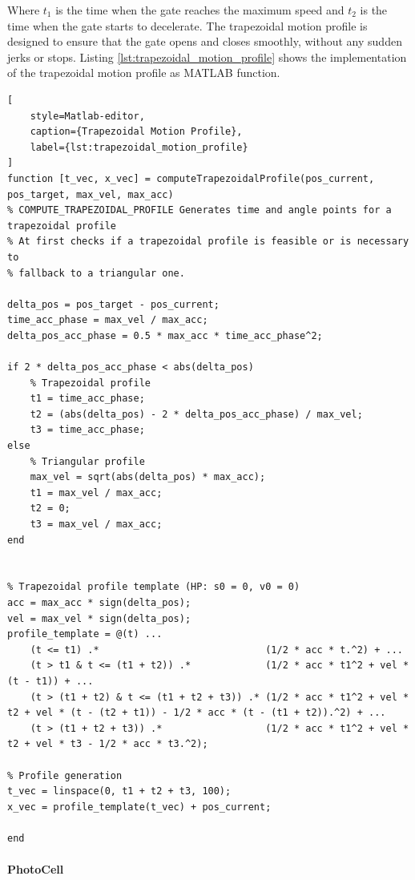 Where $t_1$ is the time when the gate reaches the maximum speed and $t_2$ is the time when the gate starts to decelerate.
The trapezoidal motion profile is designed to ensure that the gate opens and closes smoothly, without any sudden jerks or stops.
Listing \ref{lst:trapezoidal_motion_profile} shows the implementation of the trapezoidal motion profile as MATLAB function.

\begin{lstlisting}[
    style=Matlab-editor,
    caption={Trapezoidal Motion Profile},
    label={lst:trapezoidal_motion_profile}
]
function [t_vec, x_vec] = computeTrapezoidalProfile(pos_current, pos_target, max_vel, max_acc)
% COMPUTE_TRAPEZOIDAL_PROFILE Generates time and angle points for a trapezoidal profile
% At first checks if a trapezoidal profile is feasible or is necessary to
% fallback to a triangular one.

delta_pos = pos_target - pos_current;
time_acc_phase = max_vel / max_acc;
delta_pos_acc_phase = 0.5 * max_acc * time_acc_phase^2;

if 2 * delta_pos_acc_phase < abs(delta_pos)
    % Trapezoidal profile
    t1 = time_acc_phase;
    t2 = (abs(delta_pos) - 2 * delta_pos_acc_phase) / max_vel;
    t3 = time_acc_phase;
else
    % Triangular profile
    max_vel = sqrt(abs(delta_pos) * max_acc);
    t1 = max_vel / max_acc;
    t2 = 0;
    t3 = max_vel / max_acc;
end


% Trapezoidal profile template (HP: s0 = 0, v0 = 0)
acc = max_acc * sign(delta_pos);
vel = max_vel * sign(delta_pos);
profile_template = @(t) ...
    (t <= t1) .*                             (1/2 * acc * t.^2) + ...
    (t > t1 & t <= (t1 + t2)) .*             (1/2 * acc * t1^2 + vel * (t - t1)) + ...
    (t > (t1 + t2) & t <= (t1 + t2 + t3)) .* (1/2 * acc * t1^2 + vel * t2 + vel * (t - (t2 + t1)) - 1/2 * acc * (t - (t1 + t2)).^2) + ...
    (t > (t1 + t2 + t3)) .*                  (1/2 * acc * t1^2 + vel * t2 + vel * t3 - 1/2 * acc * t3.^2);

% Profile generation
t_vec = linspace(0, t1 + t2 + t3, 100);
x_vec = profile_template(t_vec) + pos_current;

end
\end{lstlisting}


\paragraph{PhotoCell}

